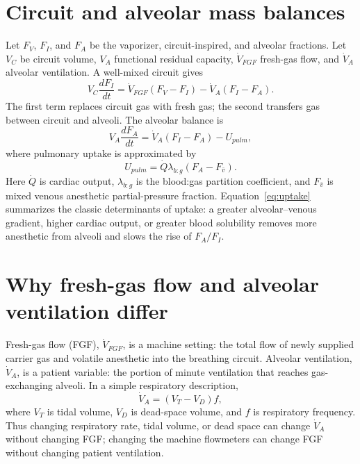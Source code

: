 \documentclass[11pt]{article}
\begin{document}
\section{Circuit and alveolar mass balances}
Let $F_V$, $F_I$, and $F_A$ be the vaporizer, circuit-inspired, and alveolar fractions. Let $V_C$ be circuit volume, $V_A$ functional residual capacity, $\dot V_{FGF}$ fresh-gas flow, and $\dot V_A$ alveolar ventilation. A well-mixed circuit gives
\begin{equation}
V_C\frac{dF_I}{dt}=\dot V_{FGF}(F_V-F_I)-\dot V_A(F_I-F_A).
\label{eq:circuit}
\end{equation}
The first term replaces circuit gas with fresh gas; the second transfers gas between circuit and alveoli. The alveolar balance is
\begin{equation}
V_A\frac{dF_A}{dt}=\dot V_A(F_I-F_A)-U_{pulm},
\label{eq:alveoli}
\end{equation}
where pulmonary uptake is approximated by
\begin{equation}
U_{pulm}=\dot Q\lambda_{b:g}(F_A-F_{\bar v}).
\label{eq:uptake}
\end{equation}
Here $\dot Q$ is cardiac output, $\lambda_{b:g}$ is the blood:gas partition coefficient, and $F_{\bar v}$ is mixed venous anesthetic partial-pressure fraction. Equation~\ref{eq:uptake} summarizes the classic determinants of uptake: a greater alveolar--venous gradient, higher cardiac output, or greater blood solubility removes more anesthetic from alveoli and slows the rise of $F_A/F_I$.

\section{Why fresh-gas flow and alveolar ventilation differ}
Fresh-gas flow (FGF), $\dot V_{FGF}$, is a machine setting: the total flow of newly supplied carrier gas and volatile anesthetic into the breathing circuit.  Alveolar ventilation, $\dot V_A$, is a patient variable: the portion of minute ventilation that reaches gas-exchanging alveoli.  In a simple respiratory description,
\begin{equation}
\dot V_A=(V_T-V_D)f,
\end{equation}
where $V_T$ is tidal volume, $V_D$ is dead-space volume, and $f$ is respiratory frequency.  Thus changing respiratory rate, tidal volume, or dead space can change $\dot V_A$ without changing FGF; changing the machine flowmeters can change FGF without changing patient ventilation.
\end{document}
